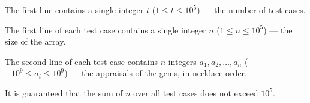 The first line contains a single integer $t$ ($1 \le t \le 10^5$) --- the number of test cases.

The first line of each test case contains a single integer $n$ ($1 \le n \le 10^5$) --- the size of the array.

The second line of each test case contains $n$ integers $a_1, a_2, \ldots, a_n$ ($-10^9 \le a_i \le 10^9$) --- the appraisals of the gems, in necklace order.

It is guaranteed that the sum of $n$ over all test cases does not exceed $10^5$.
